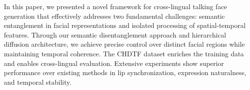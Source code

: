 \documentclass[conference]{IEEEtran}
\begin{document}
In this paper, we presented a novel framework for cross-lingual talking face generation that effectively addresses two fundamental challenges: semantic entanglement in facial representations and isolated processing of spatial-temporal features. Through our semantic disentanglement approach and hierarchical diffusion architecture, we achieve precise control over distinct facial regions while maintaining temporal coherence. The CHDTF dataset enriches the training data and enables cross-lingual evaluation. Extensive experiments show superior performance over existing methods in lip synchronization, expression naturalness, and temporal stability.




\end{document}
